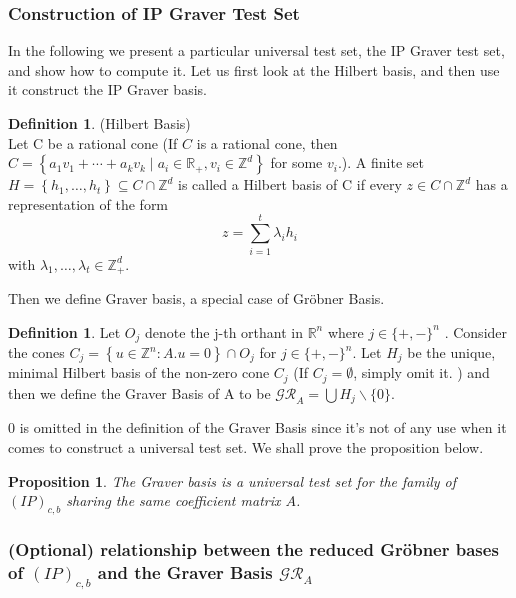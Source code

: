 \documentclass{article}
\theoremstyle{plain}
\newtheorem{proposition}[theorem]{Proposition}
\theoremstyle{definition}
\newtheorem{definition}[theorem]{Definition}
\begin{document}
 \subsubsection{Construction of IP Graver Test Set}
In the following we present a particular universal test set, the IP Graver test set, and show how to compute it. Let us first look at the Hilbert basis, and then use it construct the IP Graver basis.

\begin{definition} (Hilbert Basis) \\
Let  C  be a rational cone (If $ C$  is a rational cone, then  $C=\left\{a_{1} v_{1}+\cdots+a_{k} v_{k} \mid a_{i} \in \mathbb{R}_{+}, v_{i} \in \mathbb{Z}^{d}\right\}$ for some $v_i$.). A finite set  $H=\left\{h_{1}, \ldots, h_{t}\right\} \subseteq C \cap \mathbb{Z}^{d}$  is called a Hilbert basis of  C  if every  $z \in C \cap \mathbb{Z}^{d}$  has a representation of the form $$z=\sum_{i=1}^{t} \lambda_{i} h_{i}$$
with  $\lambda_{1}, \ldots, \lambda_{t}\in \mathbb{Z}_{+}^{d}$.
\end{definition}

Then we define Graver basis, a special case of Gröbner Basis.

 \begin{definition} Let  $O_{j}$  denote the  j-th orthant in  $\mathbb{R}^{n}$  where $ j \in\{+,-\}^{n}$ . Consider the cones $ C_{j}=\left\{u \in \mathbb{Z}^{n}: A . u=0\right\}\cap O_{j}$  for $ j \in\{+,-\}^{n}$. Let  $H_{j}$  be the unique, minimal Hilbert basis of the non-zero cone  $C_{j}$  (If $C_j=\emptyset$, simply omit it. ) and  then we define the Graver Basis of A to be $\mathcal{GR}_A=\bigcup H_{j} \backslash\{0\}$. 
 \end{definition}

0 is omitted in the definition of the Graver Basis since it's not of any use when it comes to construct a universal test set. We shall prove the proposition below. 

 \begin{proposition} The Graver basis is a universal test set for the family of  $(IP)_{c,b}$ sharing the same coefficient matrix $A$. 
 \end{proposition}

\subsubsection{(Optional) relationship between the reduced Gröbner bases of $(IP)_{c,b} $ and the Graver Basis $\mathcal{GR}_A$}
\end{document}
